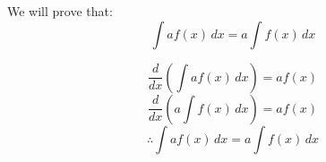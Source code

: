 We will prove that:
\[\int af(x) \, dx = a \int f(x) \, dx\]

\[\frac{d}{dx}\left( \int af(x) \, dx \right) = a f(x)\]
\[\frac{d}{dx}\left( a\int f(x) \, dx \right) = a f(x)\]
\[\therefore \int af(x) \, dx = a \int f(x) \, dx\]
